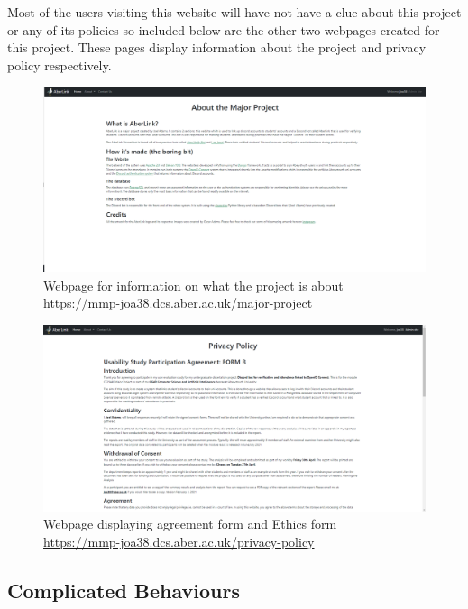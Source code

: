 Most of the users visiting this website will have not have a clue about this project or any of its policies so included below are the other two webpages created for this project. These pages display information about the project and privacy policy respectively.

\begin{figure}[H]
	\centering
	\includegraphics[width=1\linewidth]{Figures/website-mmp.png}
	\caption{Webpage for information on what the project is about \\\centering\href{https://mmp-joa38.dcs.aber.ac.uk/major-project}{https://mmp-joa38.dcs.aber.ac.uk/major-project}}
	\label{fig:final-web-mmp}
\end{figure}

\begin{figure}[H]
	\centering
	\includegraphics[width=1\linewidth]{Figures/website-privacy-policy.png}
	\caption{Webpage displaying agreement form and Ethics form \\\centering\href{https://mmp-joa38.dcs.aber.ac.uk/privacy-policy}{https://mmp-joa38.dcs.aber.ac.uk/privacy-policy}}
	\label{fig:final-web-privacy-policy}
\end{figure}

\subsection{Complicated Behaviours}

